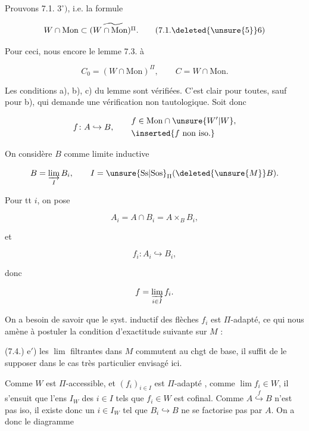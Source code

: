 
Prouvons 7.1. $3^\circ)$,  i.e. la formule

\[
W\cap\mathrm{Mon}\subset\widetilde{(W\cap\mathrm{Mon})^\Pi}.\tag*{(7.1.\deleted{\unsure{5}}6)}
\]

Pour ceci, nous  encore le lemme 7.3. à

\[
C_0=(W\cap\mathrm{Mon})^\Pi,\qquad C=W\cap\mathrm{Mon}.
\]

Les conditions a), b), c)  du lemme sont vérifiées. C'est clair pour toutes, sauf pour b), qui demande une vérification non tautologique. Soit donc

\[
f\colon A\hookrightarrow B,\qquad \begin{aligned}&f\in\mathrm{Mon}\cap\unsure{W'|W},\\&\inserted{f\text{ non iso.}}\end{aligned}
\]

On considère $B$ comme limite inductive

\[
B=\varinjlim_I B_i,\qquad I=\unsure{\mathrm{Ss}|\mathrm{Sos}}_\Pi(\deleted{\unsure{M}}B).
\]


Pour tt $i$, on pose

\[
A_i=A\cap B_i=A\times_B B_i,
\]

et

\[
f_i\colon A_i\hookrightarrow B_i,
\]

donc

\[
f=\varinjlim_{i\in I} f_i.
\]

On a besoin de savoir que le syst. inductif des flèches $f_i$ est $\Pi$-adapté, ce qui nous amène à postuler la condition d'exactitude  suivante sur $M$ :


(7.4.) e$'$) les \uline{$\lim$} filtrantes dans $M$ commutent au chgt de base, il suffit  de le supposer dans le cas très particulier  envisagé ici. \unsure{//}

Comme  $W$ est $\Pi$-accessible, et $(f_i)_{i\in I}$ est $\Pi$-adapté , comme $\lim f_i\in W$, il s'ensuit que l'ens  $I_W$ des $i\in I$ tels que $f_i\in W$ est cofinal. Comme $A\overset{f}{\hookrightarrow}B$ n'est pas iso, il existe donc un $i\in I_W$ tel que $B_i\hookrightarrow B$ ne se factorise pas par $A$. On a donc le diagramme

